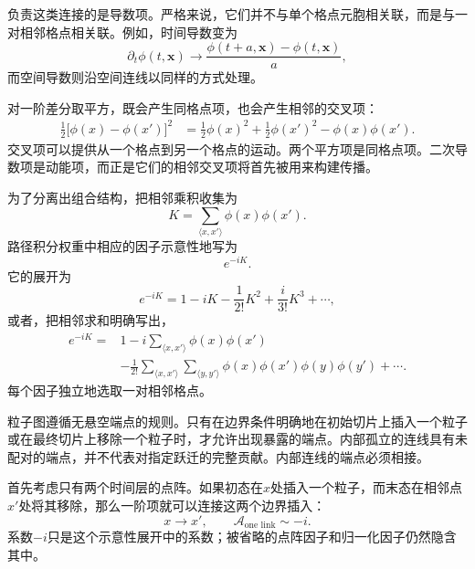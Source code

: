 负责这类连接的是导数项。严格来说，它们并不与单个格点元胞相关联，而是与一对相邻格点相关联。例如，时间导数变为
\begin{equation}
\partial_t\phi(t,\mathbf{x})
\longrightarrow
\frac{\phi(t+a,\mathbf{x})-\phi(t,\mathbf{x})}{a},
\end{equation}
而空间导数则沿空间连线以同样的方式处理。

\begin{classroomqa}
\end{classroomqa}

对一阶差分取平方，既会产生同格点项，也会产生相邻的交叉项：
\begin{align}
\frac{1}{2}\bigl[\phi(x)-\phi(x')\bigr]^2
&=
\frac{1}{2}\phi(x)^2
+\frac{1}{2}\phi(x')^2
-\phi(x)\phi(x').
\end{align}
交叉项可以提供从一个格点到另一个格点的运动。两个平方项是同格点项。二次导数项是动能项，而正是它们的相邻交叉项将首先被用来构建传播。

为了分离出组合结构，把相邻乘积收集为
\begin{equation}
K=\sum_{\langle x,x'\rangle}\phi(x)\phi(x').
\end{equation}
路径积分权重中相应的因子示意性地写为
\begin{equation}
e^{-iK}.
\end{equation}
它的展开为
\begin{equation}
e^{-iK}
=1-iK-\frac{1}{2!}K^2+\frac{i}{3!}K^3+\cdots,
\end{equation}
或者，把相邻求和明确写出，
\begin{align}
e^{-iK}
={}&1
-i\sum_{\langle x,x'\rangle}\phi(x)\phi(x')
\nonumber\\
&-\frac{1}{2!}
\sum_{\langle x,x'\rangle}
\sum_{\langle y,y'\rangle}
\phi(x)\phi(x')\phi(y)\phi(y')
+\cdots .
\end{align}
每个因子独立地选取一对相邻格点。

粒子图遵循无悬空端点的规则。只有在边界条件明确地在初始切片上插入一个粒子或在最终切片上移除一个粒子时，才允许出现暴露的端点。内部孤立的连线具有未配对的端点，并不代表对指定跃迁的完整贡献。内部连线的端点必须相接。

首先考虑只有两个时间层的点阵。如果初态在\(x\)处插入一个粒子，而末态在相邻点\(x'\)处将其移除，那么一阶项就可以连接这两个边界插入：
\begin{equation}
x\longrightarrow x',
\qquad
\mathcal{A}_{\text{one link}}\sim -i.
\end{equation}
系数\(-i\)只是这个示意性展开中的系数；被省略的点阵因子和归一化因子仍然隐含其中。

